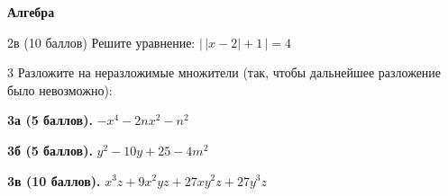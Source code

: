 
\begin{center}
    \textbf{Алгебра}
\end{center}



\smallskip


\smallskip


\smallskip

\begin{problem}{2в (10 баллов)}
Решите уравнение: $\bigl|\,|x-2|+1\,\bigr|=4$
\end{problem}

\smallskip

\noindent{}

\smallskip

\begin{problem}{3}
Разложите на неразложимые множители (так, чтобы дальнейшее разложение было невозможно):
\end{problem}

\bigskip

\noindent \textbf{3а (5 баллов).} $-x^4 - 2nx^2 - n^2$

\smallskip

\rowans{1ex}

\bigskip

\noindent \textbf{3б (5 баллов).} $y^2 - 10y + 25 - 4m^2$

\smallskip

\rowans{1ex}

\bigskip

\noindent \textbf{3в (10 баллов).} $x^3z + 9x^2yz + 27xy^2z + 27y^3z$

\smallskip

\rowans{1ex}

